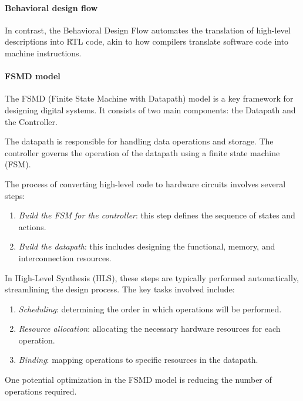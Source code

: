 \paragraph*{Behavioral design flow}
In contrast, the Behavioral Design Flow automates the translation of high-level descriptions into RTL code, akin to how compilers translate software code into machine instructions.

\paragraph*{FSMD model}
The FSMD (Finite State Machine with Datapath) model is a key framework for designing digital systems. 
It consists of two main components: the Datapath and the Controller.

The datapath is responsible for handling data operations and storage.
The controller governs the operation of the datapath using a finite state machine (FSM).

The process of converting high-level code to hardware circuits involves several steps:
\begin{enumerate}
    \item \textit{Build the FSM for the controller}: this step defines the sequence of states and actions.
    \item \textit{Build the datapath}: this includes designing the functional, memory, and interconnection resources.
\end{enumerate}
In High-Level Synthesis (HLS), these steps are typically performed automatically, streamlining the design process. The key tasks involved include:
\begin{enumerate}
    \item \textit{Scheduling}: determining the order in which operations will be performed.
    \item \textit{Resource allocation}: allocating the necessary hardware resources for each operation.
    \item \textit{Binding}: mapping operations to specific resources in the datapath.
\end{enumerate}
One potential optimization in the FSMD model is reducing the number of operations required. 

